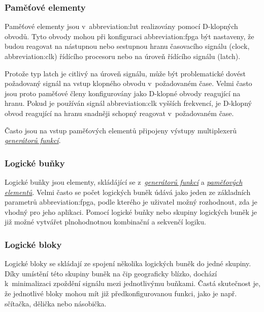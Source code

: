\documentclass[a4paper, twoside, 11pt]{article}
\begin{document}
	\subsubsection{Paměťové elementy}\label{subsubsec:pametove-elementy}
		Paměťové elementy jsou v~\gls{abbreviation:lut} realizovány pomocí D-klopných obvodů. Tyto obvody mohou při konfiguraci \gls{abbreviation:fpga} být nastaveny, že budou reagovat na nástupnou nebo sestupnou hranu časovacího signálu (clock, \gls{abbreviation:clk}) řídícího procesoru nebo na úroveň řídícího signálu (latch).\cite{Sass2010}\par
		Protože typ latch je citlivý na úroveň signálu, může být problematické dovést požadovaný signál na vstup klopného obvodu v~požadovaném čase. Velmi často jsou proto paměťové členy konfigurovány jako D-klopné obvody reagující na hranu. Pokud je používán signál \gls{abbreviation:clk} vyšších frekvencí, je D-klopný obvod reagující na hranu snadněji schopný reagovat v~požadovaném čase. \cite{Sass2010}\par
		Často jsou na vstup paměťových elementů připojeny výstupy multiplexerů \hyperref[subsubsec:generatory-funkci]{\textit{generátorů funkcí}}. \cite{Sass2010}

		\subsubsection{Logické buňky}
			Logické buňky jsou elementy, skládájící se z~\hyperref[subsubsec:generatory-funkci]{\textit{generátorů funkcí}} a \hyperref[subsubsec:pametove-elementy]{\textit{paměťových elementů}}. Velmi často se počet logických buněk údává jako jeden ze základních parametrů \gls{abbreviation:fpga}, podle kterého je uživatel možný rozhodnout, zda je vhodný pro jeho aplikaci. Pomocí logické buňky nebo skupiny logických buněk je již možné vytvářet plnohodnotnou kombinační a sekvenčí logiku.\cite{Sass2010}

		\subsubsection{Logické bloky}\label{subsubsec:logicke-bloky}
			Logické bloky se skládají ze spojení několika logických buněk do jedné skupiny. Díky umístění této skupiny buněk na čip geograficky blízko, dochází k~minimalizaci zpoždění signálu mezi jednotlivýmu buňkami. Častá skutečnost je, že jednotlivé bloky mohou mít již předkonfigurovanou funkci, jako je např. sčítačka, dělička nebo násobička. \cite{Sass2010}
\end{document}
